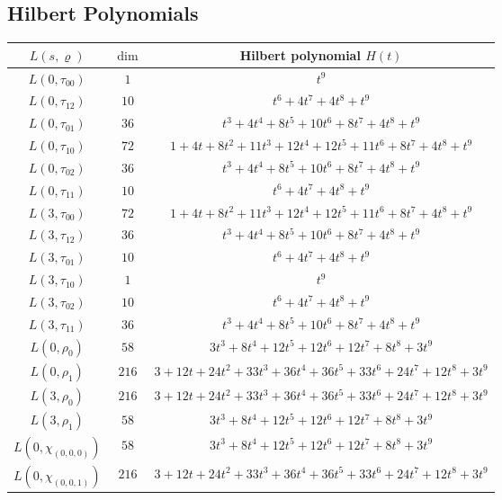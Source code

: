 \subsection{Hilbert Polynomials}

\begin{center}
\begin{tabular}{c|c|c}
\hline
$L(s,\varrho)$ & $\dim$ & Hilbert polynomial $H(t)$ \\
\hline
$L(0,\tau_{00})$ & $1$ & $t^{9}$ \\
$L(0,\tau_{12})$ & $10$ & $t^{6} + 4t^{7} + 4t^{8} + t^{9}$ \\
$L(0,\tau_{01})$ & $36$ & $t^{3} + 4t^{4} + 8t^{5} + 10t^{6} + 8t^{7} + 4t^{8} + t^{9}$ \\
$L(0,\tau_{10})$ & $72$ & $1 + 4t + 8t^{2} + 11t^{3} + 12t^{4} + 12t^{5} + 11t^{6} + 8t^{7} + 4t^{8} + t^{9}$ \\
$L(0,\tau_{02})$ & $36$ & $t^{3} + 4t^{4} + 8t^{5} + 10t^{6} + 8t^{7} + 4t^{8} + t^{9}$ \\
$L(0,\tau_{11})$ & $10$ & $t^{6} + 4t^{7} + 4t^{8} + t^{9}$ \\
$L(3,\tau_{00})$ & $72$ & $1 + 4t + 8t^{2} + 11t^{3} + 12t^{4} + 12t^{5} + 11t^{6} + 8t^{7} + 4t^{8} + t^{9}$ \\
$L(3,\tau_{12})$ & $36$ & $t^{3} + 4t^{4} + 8t^{5} + 10t^{6} + 8t^{7} + 4t^{8} + t^{9}$ \\
$L(3,\tau_{01})$ & $10$ & $t^{6} + 4t^{7} + 4t^{8} + t^{9}$ \\
$L(3,\tau_{10})$ & $1$ & $t^{9}$ \\
$L(3,\tau_{02})$ & $10$ & $t^{6} + 4t^{7} + 4t^{8} + t^{9}$ \\
$L(3,\tau_{11})$ & $36$ & $t^{3} + 4t^{4} + 8t^{5} + 10t^{6} + 8t^{7} + 4t^{8} + t^{9}$ \\
$L(0,\rho_{0})$ & $58$ & $3t^{3} + 8t^{4} + 12t^{5} + 12t^{6} + 12t^{7} + 8t^{8} + 3t^{9}$ \\
$L(0,\rho_{1})$ & $216$ & $3 + 12t + 24t^{2} + 33t^{3} + 36t^{4} + 36t^{5} + 33t^{6} + 24t^{7} + 12t^{8} + 3t^{9}$ \\
$L(3,\rho_{0})$ & $216$ & $3 + 12t + 24t^{2} + 33t^{3} + 36t^{4} + 36t^{5} + 33t^{6} + 24t^{7} + 12t^{8} + 3t^{9}$ \\
$L(3,\rho_{1})$ & $58$ & $3t^{3} + 8t^{4} + 12t^{5} + 12t^{6} + 12t^{7} + 8t^{8} + 3t^{9}$ \\
$L(0,\chi_{(0,0,0)})$ & $58$ & $3t^{3} + 8t^{4} + 12t^{5} + 12t^{6} + 12t^{7} + 8t^{8} + 3t^{9}$ \\
$L(0,\chi_{(0,0,1)})$ & $216$ & $3 + 12t + 24t^{2} + 33t^{3} + 36t^{4} + 36t^{5} + 33t^{6} + 24t^{7} + 12t^{8} + 3t^{9}$ \\

\end{tabular}
\end{center}
